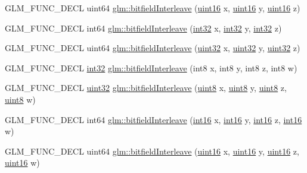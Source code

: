 \begin{DoxyCompactItemize}
\item 
G\+L\+M\+\_\+\+F\+U\+N\+C\+\_\+\+D\+E\+C\+L uint64 \hyperlink{group__gtc__bitfield_ga3c170e2ec54f2faab5e1c5bb693d718d}{glm\+::bitfield\+Interleave} (\hyperlink{stb__image_8c_a05f6b0ae8f6a6e135b0e290c25fe0e4e}{uint16} x, \hyperlink{stb__image_8c_a05f6b0ae8f6a6e135b0e290c25fe0e4e}{uint16} y, \hyperlink{stb__image_8c_a05f6b0ae8f6a6e135b0e290c25fe0e4e}{uint16} z)
\item 
G\+L\+M\+\_\+\+F\+U\+N\+C\+\_\+\+D\+E\+C\+L int64 \hyperlink{group__gtc__bitfield_ga64e2d84f6560af3cc639644b1e628c42}{glm\+::bitfield\+Interleave} (\hyperlink{stb__image_8c_a43d43196463bde49cb067f5c20ab8481}{int32} x, \hyperlink{stb__image_8c_a43d43196463bde49cb067f5c20ab8481}{int32} y, \hyperlink{stb__image_8c_a43d43196463bde49cb067f5c20ab8481}{int32} z)
\item 
G\+L\+M\+\_\+\+F\+U\+N\+C\+\_\+\+D\+E\+C\+L uint64 \hyperlink{group__gtc__bitfield_ga7c10eb37f608365cfaef5ca2c476e1ce}{glm\+::bitfield\+Interleave} (\hyperlink{stb__image_8c_a1134b580f8da4de94ca6b1de4d37975e}{uint32} x, \hyperlink{stb__image_8c_a1134b580f8da4de94ca6b1de4d37975e}{uint32} y, \hyperlink{stb__image_8c_a1134b580f8da4de94ca6b1de4d37975e}{uint32} z)
\item 
G\+L\+M\+\_\+\+F\+U\+N\+C\+\_\+\+D\+E\+C\+L \hyperlink{stb__image_8c_a43d43196463bde49cb067f5c20ab8481}{int32} \hyperlink{group__gtc__bitfield_ga7da84ecc2b3a46c9c08a9f40012359cf}{glm\+::bitfield\+Interleave} (int8 x, int8 y, int8 z, int8 w)
\item 
G\+L\+M\+\_\+\+F\+U\+N\+C\+\_\+\+D\+E\+C\+L \hyperlink{stb__image_8c_a1134b580f8da4de94ca6b1de4d37975e}{uint32} \hyperlink{group__gtc__bitfield_ga447c0bbed9d60c14578626d8f03f3755}{glm\+::bitfield\+Interleave} (\hyperlink{stb__image_8c_adde6aaee8457bee49c2a92621fe22b79}{uint8} x, \hyperlink{stb__image_8c_adde6aaee8457bee49c2a92621fe22b79}{uint8} y, \hyperlink{stb__image_8c_adde6aaee8457bee49c2a92621fe22b79}{uint8} z, \hyperlink{stb__image_8c_adde6aaee8457bee49c2a92621fe22b79}{uint8} w)
\item 
G\+L\+M\+\_\+\+F\+U\+N\+C\+\_\+\+D\+E\+C\+L int64 \hyperlink{group__gtc__bitfield_ga09ee0be0fac790a1607a711e597dd9bf}{glm\+::bitfield\+Interleave} (\hyperlink{stb__image_8c_a259fa4834387bd68627ddf37bb3ebdb9}{int16} x, \hyperlink{stb__image_8c_a259fa4834387bd68627ddf37bb3ebdb9}{int16} y, \hyperlink{stb__image_8c_a259fa4834387bd68627ddf37bb3ebdb9}{int16} z, \hyperlink{stb__image_8c_a259fa4834387bd68627ddf37bb3ebdb9}{int16} w)
\item 
G\+L\+M\+\_\+\+F\+U\+N\+C\+\_\+\+D\+E\+C\+L uint64 \hyperlink{group__gtc__bitfield_gac8a926a7bfd9b23c22a4f685193fbfe1}{glm\+::bitfield\+Interleave} (\hyperlink{stb__image_8c_a05f6b0ae8f6a6e135b0e290c25fe0e4e}{uint16} x, \hyperlink{stb__image_8c_a05f6b0ae8f6a6e135b0e290c25fe0e4e}{uint16} y, \hyperlink{stb__image_8c_a05f6b0ae8f6a6e135b0e290c25fe0e4e}{uint16} z, \hyperlink{stb__image_8c_a05f6b0ae8f6a6e135b0e290c25fe0e4e}{uint16} w)
\end{DoxyCompactItemize}


